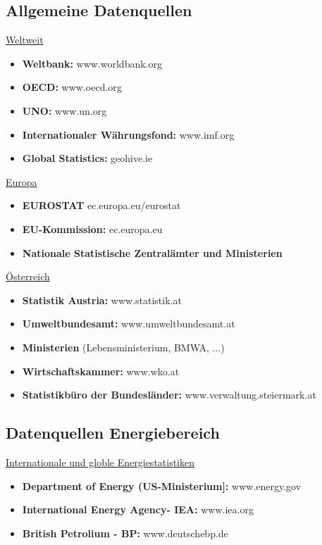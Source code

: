 \newpage

\subsection{Allgemeine Datenquellen}
\label{sec: allgemeine datenquellen}

\underline{Weltweit}
\begin{itemize}
    \item \textbf{Weltbank:} www.worldbank.org
    \item \textbf{OECD:} www.oecd.org
    \item \textbf{UNO:} www.un.org
    \item \textbf{Internationaler Währungsfond:} www.imf.org
    \item \textbf{Global Statistics:} geohive.ie
\end{itemize}

\underline{Europa}
\begin{itemize}
    \item \textbf{EUROSTAT} ec.europa.eu/eurostat
    \item \textbf{EU-Kommission:} ec.europa.eu
    \item \textbf{Nationale Statistische Zentralämter und Ministerien}
\end{itemize}

\underline{Österreich}
\begin{itemize}
    \item \textbf{Statistik Austria:} www.statistik.at
    \item \textbf{Umweltbundesamt:} www.umweltbundesamt.at
    \item \textbf{Ministerien} (Lebensministerium, BMWA, ...)
    \item \textbf{Wirtschaftskammer:} www.wko.at
    \item \textbf{Statistikbüro der Bundesländer:} www.verwaltung.steiermark.at
\end{itemize}

\newpage

\subsection{Datenquellen Energiebereich}
\label{datenquellen energiebereich - weltweit}

\underline{Internationale und globle Energiestatistiken}
\begin{itemize}
    \item \textbf{Department of Energy (US-Ministerium]:} www.energy.gov
    \item \textbf{International Energy Agency- IEA:} www.iea.org
    \item \textbf{British Petrolium - BP:} www.deutschebp.de
\end{itemize}

